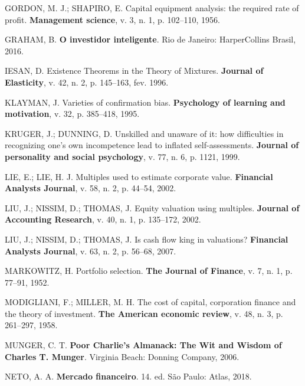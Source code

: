 \documentclass[aprovado,numbers]{coppe}
\newenvironment{cslreferences}%
  {}%
  {\par}
\begin{document}
\begin{cslreferences}
  \leavevmode\hypertarget{ref-gordon1956}{}%
  GORDON, M. J.; SHAPIRO, E. Capital equipment analysis: the required rate of profit. \textbf{Management science}, v. 3, n. 1, p. 102--110, 1956.

  \leavevmode\hypertarget{ref-graham2016}{}%
  GRAHAM, B. \textbf{O investidor inteligente}. Rio de Janeiro: HarperCollins Brasil, 2016.

  \leavevmode\hypertarget{ref-article-example}{}%
  IESAN, D. Existence Theorems in the Theory of Mixtures. \textbf{Journal of Elasticity}, v. 42, n. 2, p. 145--163, fev. 1996.

  \leavevmode\hypertarget{ref-klayman1995}{}%
  KLAYMAN, J. Varieties of confirmation bias. \textbf{Psychology of learning and motivation}, v. 32, p. 385--418, 1995.

  \leavevmode\hypertarget{ref-kruger1999}{}%
  KRUGER, J.; DUNNING, D. Unskilled and unaware of it: how difficulties in recognizing one's own incompetence lead to inflated self-assessments. \textbf{Journal of personality and social psychology}, v. 77, n. 6, p. 1121, 1999.

  \leavevmode\hypertarget{ref-lie2002}{}%
  LIE, E.; LIE, H. J. Multiples used to estimate corporate value. \textbf{Financial Analysts Journal}, v. 58, n. 2, p. 44--54, 2002.

  \leavevmode\hypertarget{ref-liu2002}{}%
  LIU, J.; NISSIM, D.; THOMAS, J. Equity valuation using multiples. \textbf{Journal of Accounting Research}, v. 40, n. 1, p. 135--172, 2002.

  \leavevmode\hypertarget{ref-liu2007}{}%
  LIU, J.; NISSIM, D.; THOMAS, J. Is cash flow king in valuations? \textbf{Financial Analysts Journal}, v. 63, n. 2, p. 56--68, 2007.

  \leavevmode\hypertarget{ref-markowitz1952}{}%
  MARKOWITZ, H. Portfolio selection. \textbf{The Journal of Finance}, v. 7, n. 1, p. 77--91, 1952.

  \leavevmode\hypertarget{ref-modigliani1958}{}%
  MODIGLIANI, F.; MILLER, M. H. The cost of capital, corporation finance and the theory of investment. \textbf{The American economic review}, v. 48, n. 3, p. 261--297, 1958.

  \leavevmode\hypertarget{ref-munger2006}{}%
  MUNGER, C. T. \textbf{Poor Charlie's Almanack: The Wit and Wisdom of Charles T. Munger}. Virginia Beach: Donning Company, 2006.

  \leavevmode\hypertarget{ref-assafneto2018}{}%
  NETO, A. A. \textbf{Mercado financeiro}. 14. ed. São Paulo: Atlas, 2018.


\end{cslreferences}
\end{document}
